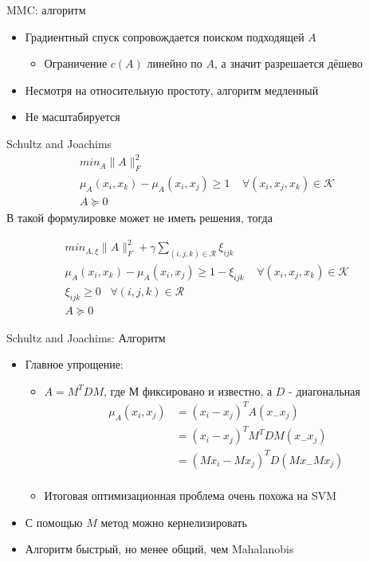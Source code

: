 \documentclass[14pt, fleqn, xcolor={dvipsnames, table}]{beamer}
\begin{document}
\begin{frame}{MMC: алгоритм}
\begin{itemize}
  \item Градиентный спуск сопровождается поиском подходящей $A$
  \begin{itemize}
    \item Ограничение $c(A)$ линейно по $A$, а значит разрешается дёшево
  \end{itemize}
  \item Несмотря на относительную простоту, алгоритм медленный
  \item Не масштабируется
\end{itemize}
\end{frame}


\begin{frame}{Schultz and Joachims}
$$\begin{array}{l}
min_A \|A\|_{F}^2 \\
\mu_A(x_i, x_k) - \mu_{A}(x_i, x_j) \ge 1 \;\;\;\; \forall (x_i,x_j,x_k) \in \mathcal{K} \\
A \succeq 0
\end{array}$$
В такой формулировке может не иметь решения, тогда

$$\begin{array}{l}
min_{A, \xi} \|A\|_{F}^2 + \gamma \sum_{(i,j,k) \in \mathcal{R}} \xi_{ijk} \\
\mu_A(x_i, x_k) - \mu_{A}(x_i, x_j) \ge 1 - \xi_{ijk} \;\;\;\; \forall (x_i,x_j,x_k) \in \mathcal{K} \\
\xi_{ijk} \ge 0 \;\;\; \forall (i,j,k) \in \mathcal{R} \\
A \succeq 0
\end{array}$$

\end{frame}

\begin{frame}{Schultz and Joachims: Алгоритм}
\begin{itemize}
  \item Главное упрощение:
  \begin{itemize}
    \item $A = M^TDM$, где $М$ фиксировано и известно, а $D$ - диагональная
    $$\begin{array}{rl}
      \mu_A(x_i, x_j) &= (x_i - x_j)^TA(x_ - x_j) \\
      &= (x_i - x_j)^TM^TDM(x_ - x_j) \\
      &= (Mx_i - Mx_j)^TD(Mx_ - Mx_j) \\
\end{array}$$
    \item Итоговая оптимизационная проблема очень похожа на SVM

  \end{itemize}
  \item С помощью $M$ метод можно кернелизировать
  \item Алгоритм быстрый, но менее общий, чем Mahalanobis
\end{itemize}
\end{frame}
\end{document}
